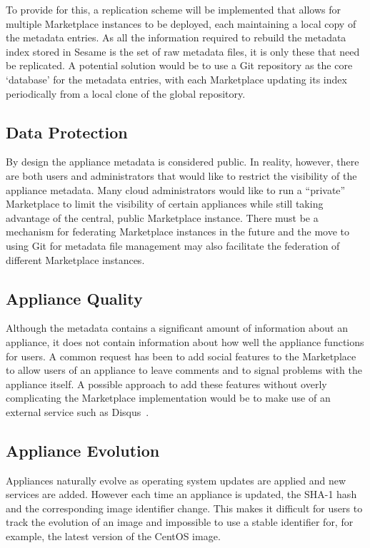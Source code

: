 To provide for this, a replication scheme will be implemented that
allows for multiple Marketplace instances to be deployed, each
maintaining a local copy of the metadata entries. As all the
information required to rebuild the metadata index stored in Sesame is
the set of raw metadata files, it is only these that need be
replicated.  A potential solution would be to use a Git repository as
the core `database' for the metadata entries, with each Marketplace
updating its index periodically from a local clone of the global
repository.

\subsection{Data Protection}

By design the appliance metadata is considered public.  In reality,
however, there are both users and administrators that would like to
restrict the visibility of the appliance metadata.  Many cloud
administrators would like to run a ``private'' Marketplace to limit
the visibility of certain appliances while still taking advantage of
the central, public Marketplace instance.  There must be a mechanism
for federating Marketplace instances in the future and the move to
using Git for metadata file management may also facilitate the
federation of different Marketplace instances.

\subsection{Appliance Quality}

Although the metadata contains a significant amount of information
about an appliance, it does not contain information about how well the
appliance functions for users.  A common request has been to add
social features to the Marketplace to allow users of an appliance to
leave comments and to signal problems with the appliance itself.  A
possible approach to add these features without overly complicating
the Marketplace implementation would be to make use of an external
service such as Disqus~\cite{disqus}.

\subsection{Appliance Evolution}

Appliances naturally evolve as operating system updates are applied
and new services are added.  However each time an appliance is
updated, the SHA-1 hash and the corresponding image identifier change.
This makes it difficult for users to track the evolution of an image
and impossible to use a stable identifier for, for example, the latest
version of the CentOS image.

